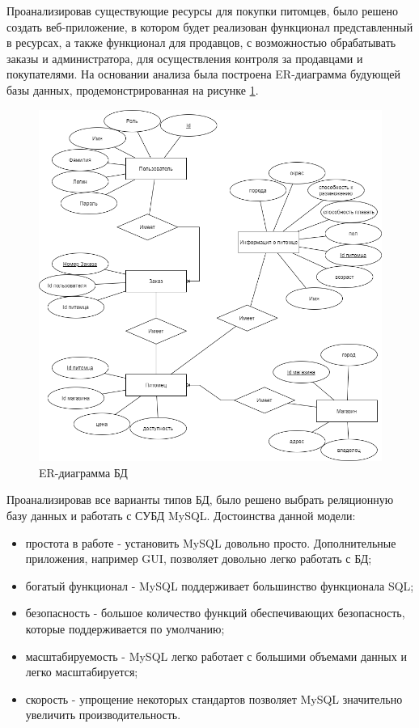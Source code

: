 \hspace{0.6cm} Проанализировав существующие ресурсы для покупки питомцев, было решено создать веб-приложение, в котором будет реализован функционал представленный в ресурсах, а также функционал для продавцов, с возможностью обрабатывать заказы и администратора, для осуществления контроля за продавцами и покупателями. На основании анализа была построена ER-диаграмма будующей базы данных, продемонстрированная на рисунке \ref{fig:image16}.

 \begin{figure}[ht!]
  \centering
  \includegraphics[scale=0.5]{ER-модель.drawio.png}
  \caption{ER-диаграмма БД}
  \label{fig:image16}
\end{figure}

\newpage

\hspace{0.6cm} Проанализировав все варианты типов БД, было решено выбрать реляционную базу данных и работать с СУБД MySQL. Достоинства данной модели:

\begin{itemize}
  \item простота в работе - установить MySQL довольно просто. Дополнительные приложения, например GUI, позволяет довольно легко работать с БД;
  \item богатый функционал - MySQL поддерживает большинство функционала SQL;
  \item безопасность - большое количество функций обеспечивающих безопасность, которые поддерживается по умолчанию;
  \item масштабируемость - MySQL легко работает с большими объемами данных и легко масштабируется;
  \item скорость - упрощение некоторых стандартов позволяет MySQL значительно увеличить производительность.
\end{itemize}



